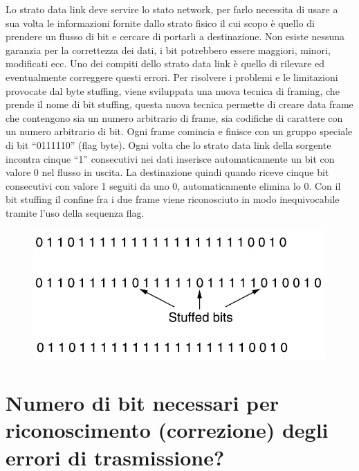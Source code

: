 Lo strato data link deve servire lo stato network, per farlo necessita di usare a sua volta le informazioni fornite dallo strato fisico il cui scopo è quello di prendere un flusso di bit e cercare di portarli a destinazione.
Non esiste nessuna garanzia per la correttezza dei dati, i bit potrebbero essere maggiori, minori, modificati ecc. Uno dei compiti dello strato data link è quello di rilevare ed eventualmente correggere questi errori.
Per risolvere i problemi e le limitazioni provocate dal byte stuffing, viene sviluppata una nuova tecnica di framing, che prende il nome di bit stuffing, questa nuova tecnica permette di creare data frame che contengono sia un numero arbitrario di frame, sia codifiche di carattere con un numero arbitrario di bit.
Ogni frame comincia e finisce con un gruppo speciale di bit “0111110” (flag byte). Ogni volta che lo strato data link della sorgente incontra cinque “1” consecutivi nei dati inserisce automaticamente un bit con valore 0 nel flusso in uscita. La destinazione quindi quando riceve cinque bit consecutivi con valore 1 seguiti da uno 0, automaticamente elimina lo 0.
Con il bit stuffing il confine fra i due frame viene riconosciuto in modo inequivocabile tramite l'uso della sequenza flag.
 
\begin{figure}[H]
\centering
\includegraphics[scale=0.8]{res/img/14_BitStuffing.png}
\end{figure}

\section{Numero di bit necessari per riconoscimento (correzione) degli errori di trasmissione?}

